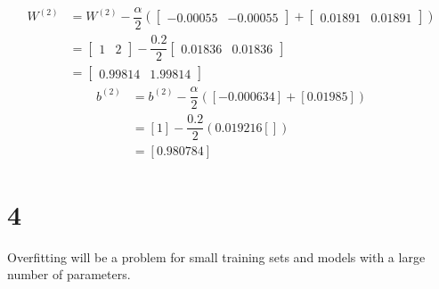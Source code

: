 \documentclass[12pt]{article}
\begin{document}
\begin{enumerate}
	\begin{align*}
		W^{(2)} &= W^{(2)} - \dfrac{\alpha}{2}\left(
			\begin{bmatrix}
				-0.00055 & -0.00055
			\end{bmatrix}
			+
			\begin{bmatrix}
				0.01891 & 0.01891
			\end{bmatrix}
			\right)\\
		&= 
			\begin{bmatrix}
				1 & 2
			\end{bmatrix}
			- \dfrac{0.2}{2}
			\begin{bmatrix}
				0.01836 & 0.01836
			\end{bmatrix}\\
		&= 
			\begin{bmatrix}
				0.99814 & 1.99814
			\end{bmatrix}
	\end{align*}
	\begin{align*}
		b^{(2)} &= b^{(2)} - \dfrac{\alpha}{2}\left([-0.000634]+[0.01985]\right)\\
		&= [1] - \dfrac{0.2}{2}\left(0.019216[]\right)\\
		&= [0.980784]
	\end{align*}
\end{enumerate}
\newpage

\section*{4}
Overfitting will be a problem for small training sets and models with a large number of parameters.
\newpage
\end{document}

